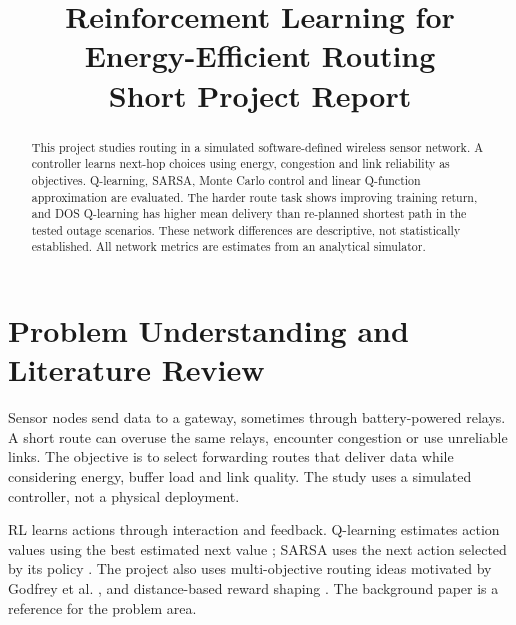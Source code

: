 \documentclass[11pt,a4paper]{article}
\title{\textbf{Reinforcement Learning for Energy-Efficient Routing}\\[0.3em]\large Short Project Report}
\author{}
\date{}
\begin{document}
\maketitle
\begin{abstract}
This project studies routing in a simulated software-defined wireless sensor network. A controller learns next-hop choices using energy, congestion and link reliability as objectives. Q-learning, SARSA, Monte Carlo control and linear Q-function approximation are evaluated. The harder route task shows improving training return, and DOS Q-learning has higher mean delivery than re-planned shortest path in the tested outage scenarios. These network differences are descriptive, not statistically established. All network metrics are estimates from an analytical simulator.
\end{abstract}

\section{Problem Understanding and Literature Review}
Sensor nodes send data to a gateway, sometimes through battery-powered relays. A short route can overuse the same relays, encounter congestion or use unreliable links. The objective is to select forwarding routes that deliver data while considering energy, buffer load and link quality. The study uses a simulated controller, not a physical deployment.

RL learns actions through interaction and feedback. Q-learning estimates action values using the best estimated next value \cite{watkins}; SARSA uses the next action selected by its policy \cite{sutton}. The project also uses multi-objective routing ideas motivated by Godfrey et al. \cite{godfrey}, and distance-based reward shaping \cite{ng}. The background paper is a reference for the problem area.
\end{document}

